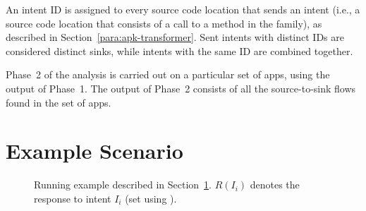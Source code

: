 An intent ID is assigned to every source code location that sends an
intent (i.e., a source code location that consists of a call to a method in the
 family), as described in Section~\ref{para:apk-transformer}.
Sent intents with distinct IDs are considered distinct sinks, while intents with 
the same ID are combined together.


Phase~2 of the analysis is carried out on
a particular set of apps, using the output of Phase~1.
The output of Phase~2 consists of all the source-to-sink flows found in the
set of apps.
%
%


\section{Example Scenario} \label{sec:example-scenario}

\begin{figure}
\center
\scalebox{0.75}{}
\caption[Running example]{Running example described in Section~\ref{sec:example-scenario}. $R(I_i)$ denotes the response to intent $I_i$ (set using ).}
\label{fig:flow1}
\end{figure}

